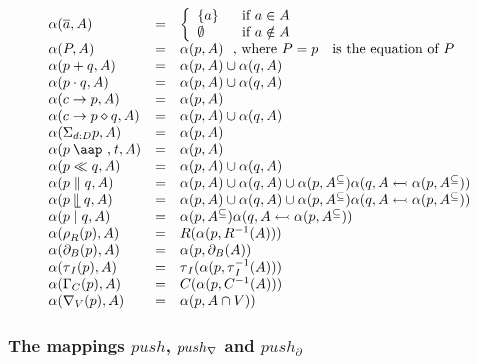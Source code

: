 \documentclass{article}
\providecommand{\at}{\mathbin{\mbox{\aap ,}}}
\providecommand{\leftmerge}{\mathbin{\mathrel{\llfloor}}}
\begin{document}
\[
\begin{array}{lll}
\alpha (\overline{a},A) & = & \left\{ 
\begin{array}{ll}
\{a\} & \text{if }a\in A \\ 
\emptyset & \text{if }a\notin A%
\end{array}%
\right. \\ 
\alpha (P,A) & = & \alpha (p,A)\text{, where }P=p\text{ is the equation of }P
\\ 
\alpha (p+q,A) & = & \alpha (p,A)\cup \alpha (q,A) \\ 
\alpha (p\cdot q,A) & = & \alpha (p,A)\cup \alpha (q,A) \\ 
\alpha (c\rightarrow p,A) & = & \alpha (p,A) \\ 
\alpha (c\rightarrow p\diamond q,A) & = & \alpha (p,A)\cup \alpha (q,A) \\ 
\alpha (\Sigma _{d:D}p,A) & = & \alpha (p,A) \\ 
\alpha (p\at t,A) & = & \alpha (p,A) \\ 
\alpha (p\ll q,A) & = & \alpha (p,A)\cup \alpha (q,A) \\ 
\alpha (p\parallel q,A) & = & \alpha (p,A)\cup \alpha (q,A)\cup \alpha
(p,A^{\subseteq })\alpha (q,A\leftarrowtail \alpha (p,A^{\subseteq })) \\ 
\alpha (p\leftmerge q,A) & = & \alpha (p,A)\cup \alpha (q,A)\cup \alpha
(p,A^{\subseteq })\alpha (q,A\leftarrowtail \alpha (p,A^{\subseteq })) \\ 
\alpha (p\mid q,A) & = & \alpha (p,A^{\subseteq })\alpha (q,A\leftarrowtail
\alpha (p,A^{\subseteq })) \\ 
\alpha (\rho _{R}(p),A) & = & R(\alpha (p,R^{-1}(A))) \\ 
\alpha (\partial _{B}(p),A) & = & \alpha (p,\partial _{B}(A)) \\ 
\alpha (\tau _{I}(p),A) & = & \tau _{I}(\alpha (p,\tau _{I}^{-1}(A))) \\ 
\alpha (\Gamma _{C}(p),A) & = & C(\alpha (p,C^{-1}(A))) \\ 
\alpha (\nabla _{V}(p),A) & = & \alpha (p,A\cap V))%
\end{array}%
\]

\subsubsection{The mappings $push$, $push_{\protect\nabla }$ and $%
push_{\partial }$}
\end{document}
